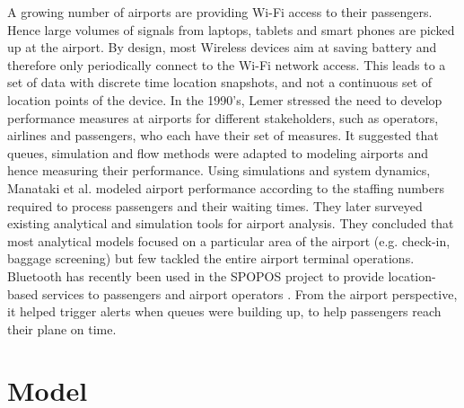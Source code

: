 \documentclass[11pt,onecolumn]{IEEEtran}
\begin{document}
A growing number of airports are providing Wi-Fi access to their passengers. Hence large volumes of signals from laptops, tablets and smart phones are picked up at the airport. By design, most Wireless devices aim at saving battery and therefore only periodically connect to the Wi-Fi network access. This leads to a set of data with discrete time location snapshots, and not a continuous set of location points of the device. In the 1990's, Lemer \cite{lemer1992measuring} stressed the need to develop performance measures at airports for different stakeholders, such as operators, airlines and passengers, who each have their set of measures. It suggested that queues, simulation and flow methods were adapted to modeling airports and hence measuring their performance. Using simulations and system dynamics, Manataki et al. \cite{manataki2009generic} modeled airport performance according to the staffing numbers required to process passengers and their waiting times. They later \cite{manataki2010assessing} surveyed existing analytical and simulation tools for airport analysis. They concluded that most analytical models focused on a particular area of the airport (e.g. check-in, baggage screening) but few tackled the entire airport terminal operations. Bluetooth has recently been used in the SPOPOS project to provide location-based services to passengers and airport operators \cite{hansen2009location}. From the airport perspective, it helped trigger alerts when queues were building up, to help passengers reach their plane on time.

\section{Model}
\end{document}
